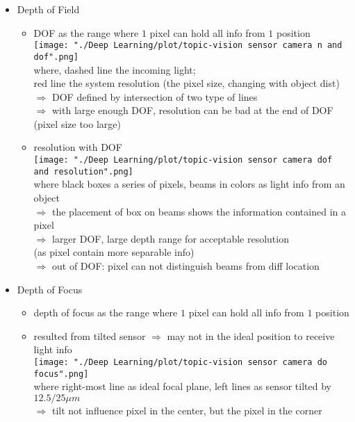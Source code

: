 \begin{itemize}
\begin{itemize}
\begin{itemize}
		\end{itemize}
	\item Depth of Field
		\begin{itemize}
		\item DOF as the range where $1$ pixel can hold all info from $1$ position \\
		\texttt{[image: "./Deep Learning/plot/topic-vision sensor  camera n and dof".png]} \\
		where, dashed line the incoming light; \\ 
		red line the system resolution (the pixel size, changing with object dist) \\
		$\Rightarrow$ DOF defined by intersection of two type of lines \\
		$\Rightarrow$ with large enough DOF, resolution can be bad at the end of DOF \\ 
		(pixel size too large)
		\item resolution with DOF \\
		\texttt{[image: "./Deep Learning/plot/topic-vision sensor  camera dof and resolution".png]} \\
		where black boxes a series of pixels, beams in colors as light info from an object \\
		$\Rightarrow$ the placement of box on beams shows the information contained in a pixel \\
		$\Rightarrow$ larger DOF, large depth range for acceptable resolution \\ 
		(as pixel contain more separable info) \\
		$\Rightarrow$ out of DOF: pixel can not distinguish beams from diff location
		\end{itemize}
	\item Depth of Focus
		\begin{itemize}
		\item depth of focus as the range where $1$ pixel can hold all info from $1$ position
		\item resulted from tilted sensor $\Rightarrow$ may not in the ideal position to receive light info \\
		\texttt{[image: "./Deep Learning/plot/topic-vision sensor camera do focus".png]} \\
		where right-most line as ideal focal plane, left lines as sensor tilted by $12.5/25\mu m$ \\
		$\Rightarrow$ tilt not influence pixel in the center, but the pixel in the corner \\

\end{itemize}
\end{itemize}
\end{itemize}
